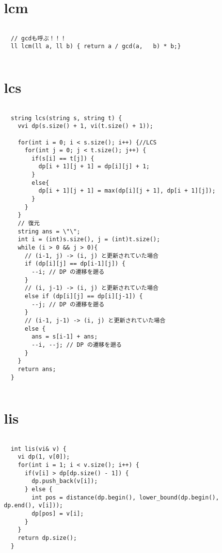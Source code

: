 \documentclass{jsarticle}
\begin{document}
\color{white}
\section{lcm}
\color{black}
\begin{lstlisting}[caption=lcm]

  // gcdも呼ぶ！！！
  ll lcm(ll a, ll b) { return a / gcd(a,   b) * b;}
  

\end{lstlisting}

\color{white}
\section{lcs}
\color{black}
\begin{lstlisting}[caption=lcs]

  string lcs(string s, string t) {
    vvi dp(s.size() + 1, vi(t.size() + 1));
    
    for(int i = 0; i < s.size(); i++) {//LCS
      for(int j = 0; j < t.size(); j++) {
        if(s[i] == t[j]) {
          dp[i + 1][j + 1] = dp[i][j] + 1;
        }
        else{
          dp[i + 1][j + 1] = max(dp[i][j + 1], dp[i + 1][j]);
        }
      }
    }
    // 復元
    string ans = \"\";
    int i = (int)s.size(), j = (int)t.size();
    while (i > 0 && j > 0){
      // (i-1, j) -> (i, j) と更新されていた場合
      if (dp[i][j] == dp[i-1][j]) {
        --i; // DP の遷移を遡る
      }
      // (i, j-1) -> (i, j) と更新されていた場合
      else if (dp[i][j] == dp[i][j-1]) {
        --j; // DP の遷移を遡る
      }
      // (i-1, j-1) -> (i, j) と更新されていた場合
      else {
        ans = s[i-1] + ans;
        --i, --j; // DP の遷移を遡る
      }
    }
    return ans;
  }
  

\end{lstlisting}

\color{white}
\section{lis}
\color{black}
\begin{lstlisting}[caption=lis]

  int lis(vi& v) {
    vi dp(1, v[0]);
    for(int i = 1; i < v.size(); i++) {
      if(v[i] > dp[dp.size() - 1]) {
        dp.push_back(v[i]);
      } else {
        int pos = distance(dp.begin(), lower_bound(dp.begin(), dp.end(), v[i]));
        dp[pos] = v[i];
      }
    }
    return dp.size();
  }
  

\end{lstlisting}
\end{document}
